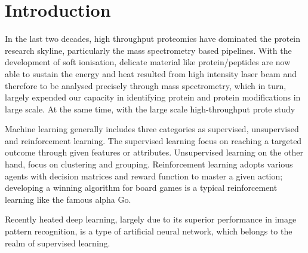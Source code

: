 \section{Introduction}

In the last two decades, high throughput proteomics have dominated the protein research skyline, particularly the mass spectrometry based pipelines. With the development of soft ionisation, delicate material like protein/peptides are now able to sustain the energy and heat resulted from high intensity laser beam and therefore to be analysed precisely through mass spectrometry, which in turn, largely expended our capacity in identifying protein and protein modifications in large scale. At the same time, with the large scale high-throughput prote study 
\par 
Machine learning generally includes three categories as supervised, unsupervised and reinforcement learning. The supervised learning focus on reaching a targeted outcome through given features or attributes. Unsupervised learning on the other hand, focus on clustering and grouping. Reinforcement learning adopts various agents with decision matrices and reward function to master a given action; developing a winning algorithm for board games is a typical reinforcement learning like the famous alpha Go.
\par
Recently heated deep learning, largely due to its superior performance in image pattern recognition, is a type of artificial neural network, which belongs to the realm of supervised learning. 
